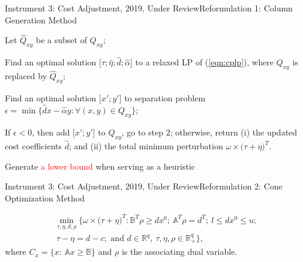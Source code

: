 \documentclass[14pt]{beamer}
\newcommand{\R}{\mathbb{R}}
\begin{document}
\begin{frame}{Instrument 3: Cost Adjustment, {\footnotesize 2019, Under Review}}{Reformulation 1: Column Generation Method}
\begin{description}
\justifying
\footnotesize
	\item[Step 1.] Let $\hat{Q}_{xy}$ be a subset of $Q_{xy}$;
	\item[Step 2.] Find an optimal solution $\big[\hat{\tau};\hat{\eta};\hat{d};\hat{\alpha}\big]$ to a relaxed LP of (\ref{eqn:cplp}), where $Q_{xy}$ is replaced by $\hat{Q}_{xy}$;
	\item[Step 3.] Find an optimal solution $\big[x';y'\big]$ to separation problem $\epsilon = \min \big\{ \hat{d}x - \hat{\alpha} y: \forall (x,y) \in Q_{xy}\big\}$;
	\item[Step 4.]
If $\epsilon<0$, then add $\big[x';y'\big]$ to $\hat{Q}_{xy}$, go to step 2; otherwise, return (i) the updated cost coefficients $\hat{d}$; and (ii) the total minimum perturbation $\omega \times \big( \tau + \eta \big)^T$.
\end{description}

\begin{shaded}
\centering
Generate \textcolor{red}{a lower bound} when serving as a heuristic
\end{shaded}
\end{frame}


\begin{frame}{Instrument 3: Cost Adjustment, {\footnotesize 2019, Under Review}}{Reformulation 2: Cone Optimization Method}
\begin{lemma}\label{lemma:equivalence1}
\centering
\small
{}
\end{lemma}
\small
\begin{eqnarray*}\label{eqn:colp2}
\min_{\tau,\eta,d,\rho} \big\{\omega \times \big( \tau+\eta \big)^T: \mathbb{B}^T\rho \geq dx^0;~\mathbb{A}^T\rho = d^T;~l \leq dx^0 \leq u;\\
~ \tau - \eta =  d-c; \mbox{ and } d \in \R^{q}, ~\tau, \eta, \rho \in \R^{q}_+\big\},
\end{eqnarray*}
\centering
where $C_x = \{x:~\mathbb{A}x \geq \mathbb{B}\}$ and $\rho$ is the associating dual variable.
\end{frame}
\end{document}
